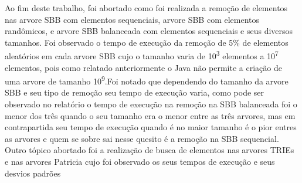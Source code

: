 \label{Conclusão}
Ao fim deste trabalho, foi abortado como foi realizada a remoção de elementos nas arvore SBB com elementos sequenciais, arvore SBB com elementos randômicos, e arvore SBB balanceada com elementos sequenciais e seus diversos tamanhos. Foi observado o tempo de execução da remoção de 5\% de elementos aleatórios em cada arvore SBB cujo o tamanho varia de 10\textsuperscript{3} elementos a 10\textsuperscript{7} elementos, pois como relatado anteriormente o Java não permite a criação de uma arvore de tamanho 10\textsuperscript{9}.Foi notado que dependendo do tamanho da arvore SBB e seu tipo de remoção seu tempo de execução varia, como pode ser observado no relatório o tempo de execução na remoção na SBB balanceada foi o menor dos três quando o seu tamanho era o menor entre as três arvores, mas em contrapartida seu tempo de execução quando é no maior tamanho é o pior entres as arvores e quem se sobre sai nesse quesito é a remoção na SBB sequencial. Outro tópico abortado foi a  realização de busca de elementos nas arvores TRIEs e nas arvores Patricia cujo foi observado os seus tempos de execução e seus desvios padrões 



